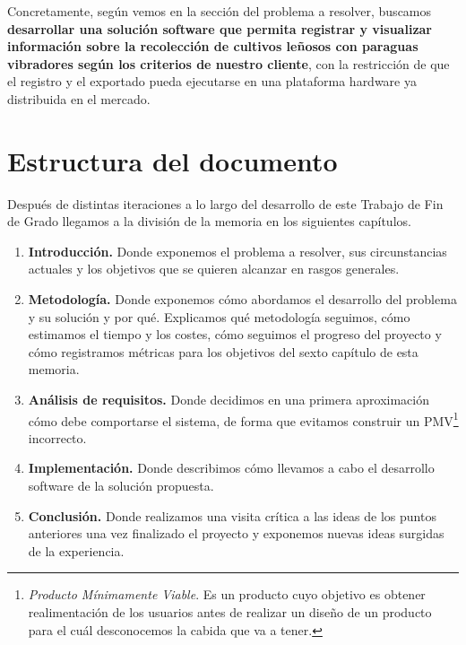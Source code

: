 Concretamente, según vemos en la sección del problema a resolver,
buscamos \textbf{desarrollar
una solución software que permita registrar y visualizar
información sobre la recolección de cultivos
leñosos con paraguas vibradores según los criterios de nuestro cliente},
con la restricción de que el registro y el exportado pueda ejecutarse en
una plataforma hardware ya distribuida en el mercado.

\vspace*{\fill}

\section{Estructura del documento}

Después de distintas iteraciones a lo largo del desarrollo de este Trabajo de Fin de Grado
llegamos a la división de la memoria en los siguientes capítulos.

\begin{enumerate}
    \item \textbf{Introducción.} Donde exponemos el problema a resolver,
          sus circunstancias actuales y los objetivos que se quieren alcanzar en rasgos generales.

    \item \textbf{Metodología.} Donde exponemos cómo abordamos el desarrollo del problema y su solución y por qué.
          Explicamos qué metodología seguimos, cómo estimamos el tiempo y los costes, cómo seguimos el progreso
          del proyecto y cómo registramos métricas para los objetivos del sexto capítulo de esta memoria.

    \item \textbf{Análisis de requisitos.} Donde decidimos en una primera aproximación cómo debe comportarse el
          sistema, de forma que evitamos construir un PMV\footnote{\textit{Producto Mínimamente Viable}.
          Es un producto cuyo objetivo es obtener realimentación de los usuarios antes de realizar un diseño de
          un producto para el cuál desconocemos la cabida que va a tener.} incorrecto.

    \item \textbf{Implementación.} Donde describimos cómo llevamos a cabo el desarrollo software
          de la solución propuesta.

    \item \textbf{Conclusión.} Donde realizamos una visita crítica a las ideas de los puntos
          anteriores una vez finalizado el proyecto y exponemos nuevas ideas surgidas de la experiencia.
\end{enumerate}
